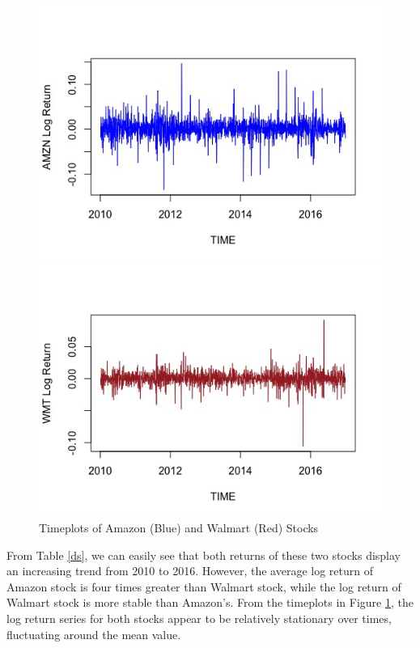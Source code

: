 \documentclass[paper=a4, fontsize=11pt]{article}
\begin{document}
\begin{figure}[!htbp]
\begin{minipage}[!htbp]{0.5\linewidth}
\centering
\includegraphics[scale = 0.45]{img/timeplot_AMZN}
\end{minipage}
\begin{minipage}[!htbp]{0.5\linewidth}
\centering
\includegraphics[scale = 0.45]{img/timeplot_WMT}
\end{minipage}
\caption{Timeplots of Amazon (Blue) and Walmart (Red) Stocks}
\label{tp}
\end{figure}

From Table \ref{ds}, we can easily see that both returns of these two stocks display an increasing trend from 2010 to 2016. However, the average log return of Amazon stock  is four times greater than Walmart stock, while the log return of Walmart stock is more stable than Amazon's. From the timeplots in Figure \ref{tp}, the log return series for both stocks appear to be relatively stationary over times, fluctuating around the mean value.
\end{document}

